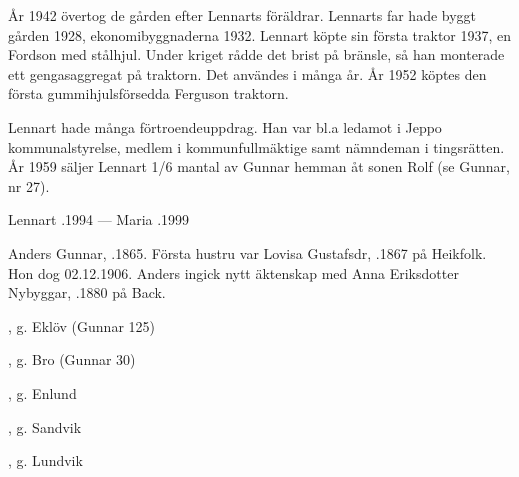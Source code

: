 
År 1942 övertog de gården efter Lennarts föräldrar. Lennarts far hade byggt gården 1928, ekonomibyggnaderna 1932. Lennart köpte sin första traktor 1937, en Fordson med stålhjul. Under kriget rådde det brist på bränsle, så han monterade ett gengasaggregat på traktorn. Det användes i många år. År 1952 köptes den första gummihjulsförsedda Ferguson traktorn.

Lennart hade många förtroendeuppdrag. Han var bl.a ledamot i Jeppo kommunalstyrelse, medlem i kommunfullmäktige samt nämndeman i tingsrätten. År 1959 säljer Lennart 1/6 mantal av Gunnar hemman åt sonen Rolf (se Gunnar, nr 27).

Lennart .1994  ---  Maria .1999


%



%
Anders Gunnar, .1865. Första hustru var Lovisa Gustafsdr, .1867 på Heikfolk. Hon dog 02.12.1906. Anders ingick nytt äktenskap med Anna Eriksdotter Nybyggar, .1880 på Back.
\begin{jhchildren}
  \item {}
  \item {}
  \item {}, g. Eklöv (Gunnar 125)
  \item {}, g. Bro (Gunnar 30)
  \item {}, g. Enlund
  \item {}
  \item {}, g. Sandvik
  \item {}, g. Lundvik
  \item {}
  \item {}
  \item {}
\end{jhchildren}

